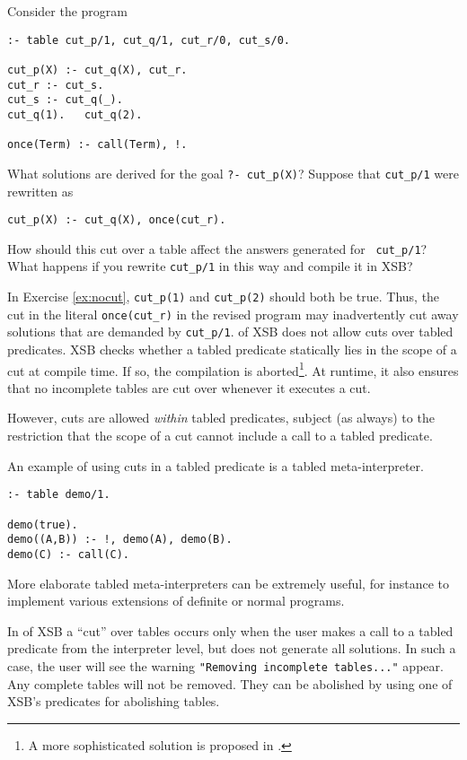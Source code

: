 \begin{exercise} \label{ex:nocut}
Consider the program
\begin{verbatim}
:- table cut_p/1, cut_q/1, cut_r/0, cut_s/0.

cut_p(X) :- cut_q(X), cut_r.
cut_r :- cut_s.
cut_s :- cut_q(_).
cut_q(1).   cut_q(2).

once(Term) :- call(Term), !.
\end{verbatim}
What solutions are derived for the goal {\tt ?- cut\_p(X)}\@?  Suppose
that {\tt cut\_p/1} were rewritten as
\begin{verbatim}
cut_p(X) :- cut_q(X), once(cut_r).
\end{verbatim}
How should this cut over a table affect the answers generated for {\tt
cut\_p/1}?  What happens if you rewrite {\tt cut\_p/1} in this way and
compile it in XSB?\fillBox
\end{exercise}

In Exercise \ref{ex:nocut}, {\tt cut\_p(1)} and {\tt cut\_p(2)} should
both be true.  Thus, the cut in the literal {\tt once(cut\_r)} in the
revised program may inadvertently cut away solutions that are demanded
by {\tt cut\_p/1}.  \version{} of XSB does not allow cuts over tabled
predicates.  XSB checks whether a tabled predicate statically lies in
the scope of a cut at compile time.  If so, the compilation is
aborted\footnote{A more sophisticated solution is proposed in
\cite{Swif99b}.}.  At runtime, it also ensures that no incomplete
tables are cut over whenever it executes a cut.

However, cuts are allowed {\em within} tabled predicates, subject (as
always) to the restriction that the scope of a cut cannot include a
call to a tabled predicate.

\begin{example}
An example of using cuts in a tabled predicate is a tabled
meta-interpreter.
\begin{verbatim}
:- table demo/1.

demo(true).
demo((A,B)) :- !, demo(A), demo(B).
demo(C) :- call(C).
\end{verbatim}
More elaborate tabled meta-interpreters can be extremely useful, for
instance to implement various extensions of definite or normal
programs.\fillBox
\end{example}

In \version{} of XSB a ``cut'' over tables occurs only when the user
makes a call to a tabled predicate from the interpreter level, but
does not generate all solutions.  In such a case, the user will see
the warning {\tt "Removing incomplete tables..."} appear.  Any
complete tables will not be removed.  They can be abolished by using
one of XSB's predicates for abolishing tables.


